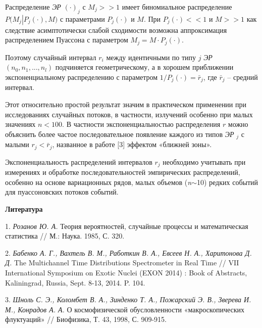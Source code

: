Распределение {\it ЭР} $(\cdot )_{j} $ с  $M_{j} >>1$  имеет биномиальное распределение $P(M_{j} \left|P_{j} (\cdot),M)\right. $ с параметрами $P_{j} (\cdot)$ и $M$. При $P_{j} (\cdot )<<1$  и $M>>1$  как следствие асимптотически слабой сходимости возможна аппроксимация распределением Пуассона с параметром $M_{j} =M\cdot P_{j} (\cdot)$.

Поэтому случайный интервал $r_{i} $ между идентичными по типу $j$  {\it ЭР} $ ( n_{0} ,  n_{1} ,  ...  ,  n_{l} )$ подчиняется геометрическому, а в хорошем приближении экспоненциальному  распределению  с параметром $1/P_{j} (\cdot)=\bar{r}_{j} $, где $\bar{r}_{j} $ -- средний интервал.


Этот относительно простой результат значим в практическом применении при исследованиях случайных потоков, в частности, излучений особенно при малых значениях $n<100$. В частности экспоненциальностью распределения $r$ можно объяснить более частое последовательное  появление  каждого из типов {\it ЭР} $ _{j} $ с малыми $r_{j} <\bar{r}_{j} $, названное в работе [3] эффектом «ближней зоны».


Экспоненциальность распределений интервалов $r_{j} $ необходимо учитывать при измерениях и обработке последовательностей эмпирических распределений, особенно на основе вариационных рядов, малых объемов (\textit{n}$\sim$10) редких событий для пуассоновских потоков событий.


\smallskip \centerline{\bf Литература}\nopagebreak

1. {\it Розанов Ю. А.} Теория вероятностей, случайные процессы и математическая статистика // М.: Наука.  1985, С. 320.

2. {\it Бабенко А. Г., Вахтель В. М., Работкин В. А., Евсеев Н. А., Харитонова Д. Д.} The Multichannel Time Distributions Spectrometer in Real Time // VII International Symposium on Exotic Nuclei (EXON 2014) : Book of Abstracts, Kaliningrad, Russia, Sept. 8-13, 2014. P. 104.

3. {\it Шноль С. Э., Коломбет В. А., Зинденко  Т. А., Пожарский Э. В., Зверева И. М., Конрадов А. А.} О космофизической обусловленности «макроскопических флуктуаций» // Биофизика, Т. 43, 1998, С. 909-915.
